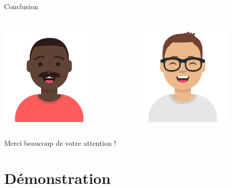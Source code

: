 \documentclass[xcolor=dvipsnames]{beamer}
\begin{document}
\begin{frame}{Conclusion}
    \begin{columns}[T]
    \begin{column}[c]{5cm}
        \includegraphics[height=5cm]{Images/avatar_david.png}
    \end{column}
    \begin{column}[c]{5cm}
        \includegraphics[height=5cm]{Images/avatar_alexandre.png}
    \end{column}
    \end{columns}
    \begin{center}\LARGE{Merci beaucoup de votre attention !}\end{center}
\end{frame}

\section{Démonstration}
\end{document}
